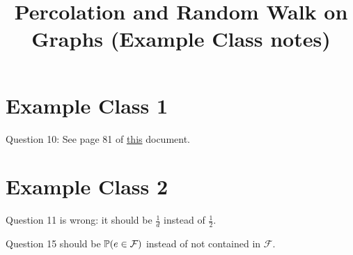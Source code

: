 \documentclass[a4paper]{article}
\begin{document}
\title{Percolation and Random Walk on Graphs (Example Class notes)}

\maketitle

\newpage

\tableofcontents

\newpage

\section{Example Class 1}

Question 10: See page 81 of \href{https://moodle.epfl.ch/pluginfile.php/1671994/mod_resource/content/1/Chap8-9.pdf}{this} document.

\section{Example Class 2}

Question 11 is wrong: it should be $\frac{1}{d}$ instead of $\frac{1}{2}$.

Question 15 should be $\P(e \in \mathcal{F})$ instead of not contained in $\mathcal{F}$.
\end{document}
